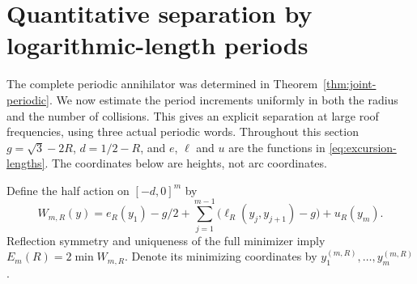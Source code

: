 \section{Quantitative separation by logarithmic-length periods}
\label{sec:quantitative-periods}
The complete periodic annihilator was determined in
Theorem~\ref{thm:joint-periodic}. We now estimate the period increments
uniformly in both the radius and the number of collisions. This gives an
explicit separation at large roof frequencies, using three actual
periodic words. Throughout this section $g=\sqrt3-2R$, $d=1/2-R$,
and $e$, $\ell$ and $u$ are the functions in
\eqref{eq:excursion-lengths}. The coordinates below are heights, not
arc coordinates.

Define the half action on $[-d,0]^m$ by
\begin{equation}\label{eq:half-action-v4}
 W_{m,R}(y)=e_R(y_1)-g/2+
       \sum_{j=1}^{m-1}\bigl(\ell_R(y_j,y_{j+1})-g\bigr)+u_R(y_m).
\end{equation}
Reflection symmetry and uniqueness of the full minimizer imply
$E_m(R)=2\min W_{m,R}$. Denote its minimizing coordinates by
$y^{(m,R)}_1,\ldots,y^{(m,R)}_m$.

